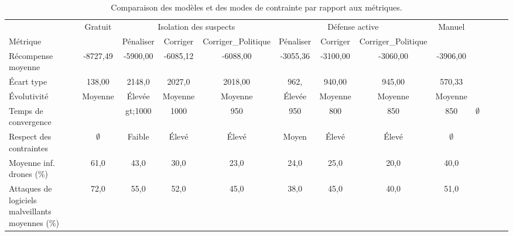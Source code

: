 \begin{table}[t]
    \centering
    \setlength{\tabcolsep}{4.5pt}
    \caption{Comparaison des modèles et des modes de contrainte par rapport aux métriques.}
    \label{tab:metrics_comparison}
    \begin{tabular}{lcccccccccccc}
                                                         & {Gratuit}   & \multicolumn{3}{c}{Isolation des suspects} & \multicolumn{3}{c}{Défense active} & {Manuel}                                                                                     \\
        Métrique                                         &             & Pénaliser                                  & Corriger                           & Corriger\_Politique & Pénaliser & Corriger & Corriger\_Politique &                           \\
        \midrule
        Récompense moyenne                               & -8727,49    & -5900,00                                   & -6085,12                           & -6088,00            & -3055,36  & -3100,00 & -3060,00            & -3906,00                  \\
        Écart type                                       & 138,00      & 2148,0                                     & 2027,0                             & 2018,00             & 962,      & 940,00   & 945,00              & 570,33                    \\
        Évolutivité                                      & Moyenne     & Élevée                                     & Moyenne                            & Moyenne             & Élevée    & Moyenne  & Moyenne             & Moyenne                   \\
        Temps de convergence                             &             & gt;1000                                    & 1000                               & 950                 & 950       & 800      & 850                 & 850         & $\emptyset$ \\
        Respect des contraintes                          & $\emptyset$ & Faible                                     & Élevé                              & Élevé               & Moyen     & Élevé    & Élevé               & $\emptyset$               \\
        Moyenne inf. drones (\%)                         & 61,0        & 43,0                                       & 30,0                               & 23,0                & 24,0      & 25,0     & 20,0                & 40,0                      \\
        Attaques de logiciels malveillants moyennes (\%) & 72,0        & 55,0                                       & 52,0                               & 45,0                & 38,0      & 45,0     & 40,0                & 51,0                      \\
    \end{tabular}
\end{table}

